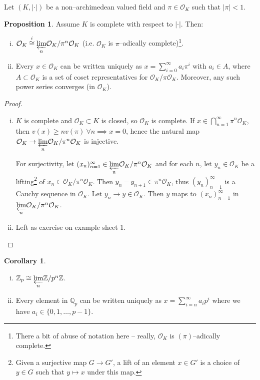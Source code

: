 \documentclass{article}
\theoremstyle{definition}
\newtheorem{cor}[theorem]{Corollary}
\newtheorem{prop}[theorem]{Proposition}
\begin{document}
Let $(K, |\cdot|)$ be a non--archimedean valued field and $\pi \in \mathcal{O}_K$  such that $|\pi|<1$.
\begin{prop}
    Assume $K$ is complete with respect to $|\cdot|$. Then:
    \begin{enumerate}[(i)]
        \item $\mathcal{O}_K \stackrel{i}{\cong} \underset{n}{\varprojlim} \mathcal{O}_K/\pi^n \mathcal{O}_K$ (i.e. $\mathcal{O}_K$ is $\pi$--adically complete)\footnote{There a bit of abuse of notation here -- really, $\mathcal{O}_K$ is $(\pi)$--adically complete.}.
        \item Every $x \in \mathcal{O}_K$ can be written uniquely as $x = \sum_{i=0}^{\infty} a_i \pi^i$ with $a_i \in A$, where $A \subset \mathcal{O}_K$ is a set of coset representatives for $\mathcal{O}_K/\pi \mathcal{O}_K$. Moreover, any such power series converges (in $\mathcal{O}_K$).
    \end{enumerate}
\end{prop} 
\begin{proof}
    \begin{enumerate}[(i)]
        \item $K$ is complete and $\mathcal{O}_K \subset K$ is closed, so $\mathcal{O}_K$ is complete. If $x \in \bigcap_{n=1}^{\infty} \pi^n \mathcal{O}_K$, then $v(x) \ge n v(\pi) ~\forall n \implies x = 0$, hence the natural map $\mathcal{O}_K \to \underset{n}{\varprojlim} \mathcal{O}_K/\pi^n \mathcal{O}_K$ is injective.
        
        For surjectivity, let $(x_n)_{n=1}^{\infty} \in \underset{n}{\varprojlim}\mathcal{O}_K/ \pi^n \mathcal{O}_K$ and for each $n$, let $y_n \in \mathcal{O}_K$ be a lifting\footnote{Given a surjective map $G \to G'$, a lift of an element $x \in G'$ is a choice of $y \in G$ such that $y \mapsto x$ under this map.} of $x_n \in \mathcal{O}_K/\pi^n \mathcal{O}_K$. Then $y_n - y_{n+1}  \in \pi^n \mathcal{O}_K$, thus $(y_n)_{n=1}^{\infty}$ is a Cauchy sequence in $\mathcal{O}_K$. Let $y_n \to y \in \mathcal{O}_K$. Then $y$ maps to $(x_n)_{n=1}^\infty$ in $\underset{n}{\varprojlim} \mathcal{O}_K/\pi^n \mathcal{O}_K$.
        \item Left as exercise on example sheet 1.
    \end{enumerate}
\end{proof}
\begin{cor}
    \begin{enumerate}[(i)]
        \item $\mathbb{Z}_p \cong \underset{n}{\varprojlim} \mathbb{Z}/p^n \mathbb{Z}$.
        \item Every element in $\mathbb{Q}_p$ can be written uniquely as $x = \sum_{i=n}^{\infty} a_i p^i$ where we have $a_i \in \{0,1,\ldots,p-1\}$.
    \end{enumerate}
\end{cor}
\end{document}
